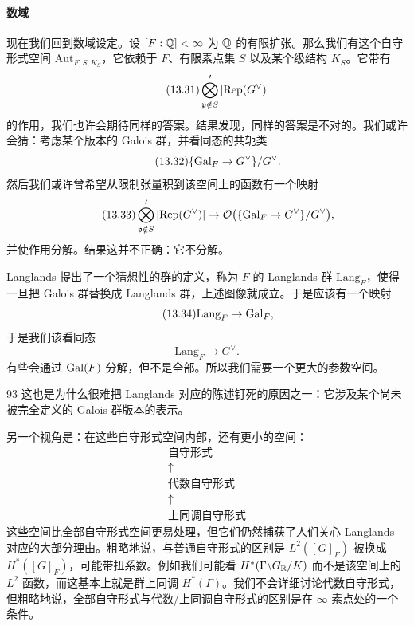 \paragraph{数域}
现在我们回到数域设定。设 $[F:\mathbb{Q}]<\infty$ 为 $\mathbb{Q}$ 的有限扩张。那么我们有这个自守形式空间 $\mathrm{Aut}_{F,S,K_S}$，它依赖于 $F$、有限素点集 $S$ 以及某个级结构 $K_S$。它带有
\begin{equation}\tag{13.31}
\bigotimes'_{\mathfrak p\notin S}|\mathrm{Rep}(G^\vee)|
\end{equation}
的作用，我们也许会期待同样的答案。结果发现，同样的答案是不对的。我们或许会猜：考虑某个版本的 Galois 群，并看同态的共轭类
\begin{equation}\tag{13.32}
\{\mathrm{Gal}_F\to G^\vee\}/G^\vee.
\end{equation}
然后我们或许曾希望从限制张量积到该空间上的函数有一个映射
\begin{equation}\tag{13.33}
\bigotimes'_{\mathfrak p\notin S}|\mathrm{Rep}(G^\vee)|\to\mathcal{O}\bigl(\{\mathrm{Gal}_F\to G^\vee\}/G^\vee\bigr),
\end{equation}
并使作用分解。结果这并不正确：它不分解。

Langlands 提出了一个猜想性的群的定义，称为 $F$ 的 Langlands 群 $\mathrm{Lang}_F$，使得一旦把 Galois 群替换成 Langlands 群，上述图像就成立。于是应该有一个映射
\begin{equation}\tag{13.34}
\mathrm{Lang}_F\to\mathrm{Gal}_F,
\end{equation}
于是我们该看同态
\begin{equation}\tag{13.35}
\mathrm{Lang}_F\to G^\vee.
\end{equation}
有些会通过 $\mathrm{Gal}(F)$ 分解，但不是全部。所以我们需要一个更大的参数空间。

\begin{srcrem}{93}
这也是为什么很难把 Langlands 对应的陈述钉死的原因之一：它涉及某个尚未被完全定义的 Galois 群版本的表示。
\end{srcrem}

另一个视角是：在这些自守形式空间内部，还有更小的空间：
\begin{equation}\tag{13.36}
\begin{array}{c}
\text{自守形式}\\[2pt]
\uparrow\\[2pt]
\text{代数自守形式}\\[2pt]
\uparrow\\[2pt]
\text{上同调自守形式}
\end{array}
\end{equation}
这些空间比全部自守形式空间更易处理，但它们仍然捕获了人们关心 Langlands 对应的大部分理由。粗略地说，与普通自守形式的区别是 $L^2([G]_F)$ 被换成 $H^*([G]_F)$，可能带扭系数。例如我们可能看 $H^*(\Gamma\backslash G_{\mathbb{R}}/K)$ 而不是该空间上的 $L^2$ 函数，而这基本上就是群上同调 $H^*(\Gamma)$。我们不会详细讨论代数自守形式，但粗略地说，全部自守形式与代数/上同调自守形式的区别是在 $\infty$ 素点处的一个条件。

